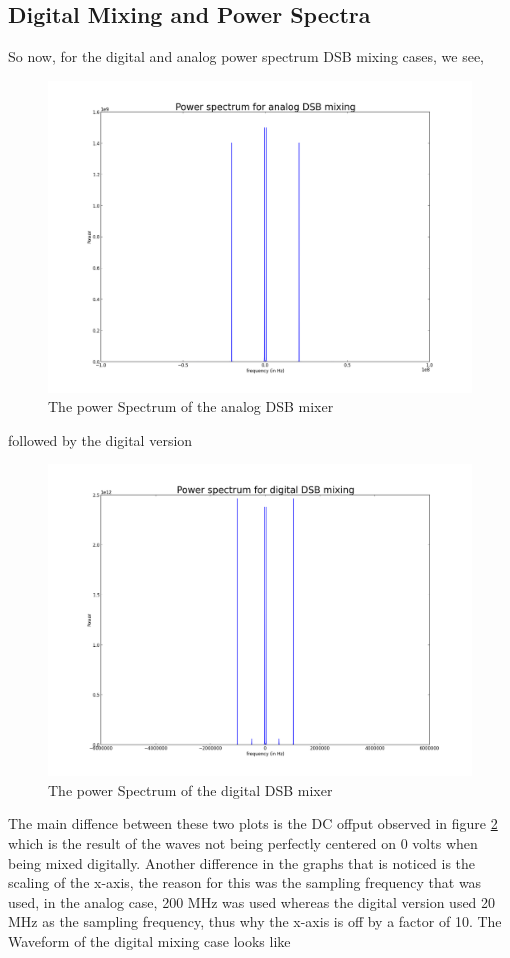 \documentclass[12 pt]{article}
\begin{document}
\subsection{Digital Mixing and Power Spectra}
So now, for the digital and analog power spectrum DSB mixing cases, we
see,
\begin{figure}[H]
\center
\includegraphics[scale=0.4]{powerspectanadigdsbmix.png}
\caption{The power Spectrum of the analog DSB mixer}
\label{anadsb}
\end{figure}
followed by the digital version
\begin{figure}[H]
\center
\includegraphics[scale=0.4]{powerspectdigdsbmix.png}
\caption{The power Spectrum of the digital DSB mixer}
\label{digdsb}
\end{figure}
The main diffence between these two plots is the DC offput observed in figure
\ref{digdsb} which is the result of the waves not being perfectly
centered on 0 volts when being mixed digitally. Another difference in
the graphs that is noticed is the scaling of the x-axis,  the reason for
this was the sampling frequency that was used, in the analog case, 200
MHz was used whereas the digital version used 20 MHz as the sampling
frequency, thus why the x-axis is off by a factor of 10. The Waveform of
the digital mixing case looks like 
\end{document}
